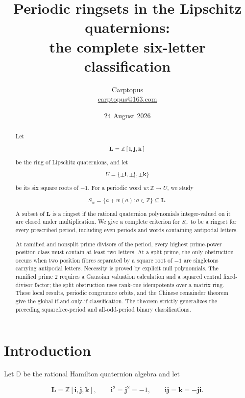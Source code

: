 \documentclass[11pt]{article}
\title{Periodic ringsets in the Lipschitz quaternions:\\
the complete six-letter classification}
\author{Carptopus\\\href{mailto:carptopus@163.com}{carptopus@163.com}}
\date{24 August 2026}
\numberwithin{equation}{section}
\begin{document}
\maketitle

\begin{abstract}

Let

\nopagebreak[4]
\[
\mathbf L=\mathbb Z[\mathbf i,\mathbf j,\mathbf k]
\]

be the ring of Lipschitz quaternions, and let

\nopagebreak[4]
\[
U=\{\pm\mathbf i,\pm\mathbf j,\pm\mathbf k\}
\]

be its six square roots of $-1$. For a periodic word
$w:\mathbb Z\to U$, we study

\nopagebreak[4]
\[
S_w=\{a+w(a):a\in\mathbb Z\}\subseteq\mathbf L.
\]

A subset of $\mathbf L$ is a ringset if the rational quaternion polynomials
integer-valued on it are closed under multiplication. We give a complete
criterion for $S_w$ to be a ringset for every prescribed period, including
even periods and words containing antipodal letters.

At ramified and nonsplit prime divisors of the period, every highest
prime-power position class must contain at least two letters. At a split
prime, the only obstruction occurs when two position fibres separated by a
square root of $-1$ are singletons carrying antipodal letters. Necessity is
proved by explicit null polynomials. The ramified prime $2$ requires a
Gaussian valuation calculation and a squared central fixed-divisor factor;
the split obstruction uses rank-one idempotents over a matrix ring. These
local results, periodic congruence orbits, and the Chinese remainder theorem
give the global if-and-only-if classification. The theorem strictly
generalizes the preceding squarefree-period and all-odd-period binary
classifications.

\end{abstract}

\section{Introduction}


Let $\mathbb D$ be the rational Hamilton quaternion algebra and let

\nopagebreak[4]
\[
\mathbf L
=\mathbb Z[\mathbf i,\mathbf j,\mathbf k],
\qquad
\mathbf i^2=\mathbf j^2=-1,
\qquad
\mathbf i\mathbf j=\mathbf k=-\mathbf j\mathbf i.
\]
\end{document}
